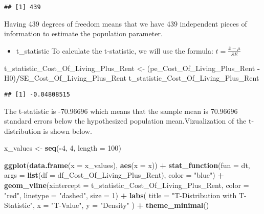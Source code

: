 \documentclass[
]{article}
\newenvironment{Shaded}{\begin{snugshade}}{\end{snugshade}}
\newcommand{\AttributeTok}[1]{\textcolor[rgb]{0.13,0.29,0.53}{#1}}
\newcommand{\DecValTok}[1]{\textcolor[rgb]{0.00,0.00,0.81}{#1}}
\newcommand{\FunctionTok}[1]{\textcolor[rgb]{0.13,0.29,0.53}{\textbf{#1}}}
\newcommand{\NormalTok}[1]{#1}
\newcommand{\OtherTok}[1]{\textcolor[rgb]{0.56,0.35,0.01}{#1}}
\newcommand{\SpecialCharTok}[1]{\textcolor[rgb]{0.81,0.36,0.00}{\textbf{#1}}}
\newcommand{\StringTok}[1]{\textcolor[rgb]{0.31,0.60,0.02}{#1}}
\providecommand{\tightlist}{%
  \setlength{\itemsep}{0pt}\setlength{\parskip}{0pt}}
\begin{document}
\begin{verbatim}
## [1] 439
\end{verbatim}

Having 439 degrees of freedom means that we have 439 independent pieces
of information to estimate the population parameter.

\begin{itemize}
\tightlist
\item
  t\_statistic To calculate the t-statistic, we will use the formula:
  \(t = \frac{\bar{x} - \mu}{SE}\)
\end{itemize}

\begin{Shaded}
\begin{Highlighting}[]
\NormalTok{t\_statistic\_Cost\_Of\_Living\_Plus\_Rent }\OtherTok{\textless{}{-}}\NormalTok{  (pe\_Cost\_Of\_Living\_Plus\_Rent }\SpecialCharTok{{-}}\NormalTok{ H0)}\SpecialCharTok{/}\NormalTok{SE\_Cost\_Of\_Living\_Plus\_Rent}
\NormalTok{t\_statistic\_Cost\_Of\_Living\_Plus\_Rent}
\end{Highlighting}
\end{Shaded}

\begin{verbatim}
## [1] -0.04808515
\end{verbatim}

The t-statistic is -70.96696 which means that the sample mean is
70.96696 standard errors below the hypothesized population
mean.Vizualization of the t-distribution is shown below.

\begin{Shaded}
\begin{Highlighting}[]
\NormalTok{x\_values }\OtherTok{\textless{}{-}} \FunctionTok{seq}\NormalTok{(}\SpecialCharTok{{-}}\DecValTok{4}\NormalTok{, }\DecValTok{4}\NormalTok{, }\AttributeTok{length =} \DecValTok{100}\NormalTok{)}

\FunctionTok{ggplot}\NormalTok{(}\FunctionTok{data.frame}\NormalTok{(}\AttributeTok{x =}\NormalTok{ x\_values), }\FunctionTok{aes}\NormalTok{(}\AttributeTok{x =}\NormalTok{ x)) }\SpecialCharTok{+}
  \FunctionTok{stat\_function}\NormalTok{(}\AttributeTok{fun =}\NormalTok{ dt, }\AttributeTok{args =} \FunctionTok{list}\NormalTok{(}\AttributeTok{df =}\NormalTok{ df\_Cost\_Of\_Living\_Plus\_Rent), }\AttributeTok{color =} \StringTok{"blue"}\NormalTok{) }\SpecialCharTok{+}
  \FunctionTok{geom\_vline}\NormalTok{(}\AttributeTok{xintercept =}\NormalTok{ t\_statistic\_Cost\_Of\_Living\_Plus\_Rent, }\AttributeTok{color =} \StringTok{"red"}\NormalTok{, }\AttributeTok{linetype =} \StringTok{"dashed"}\NormalTok{, }\AttributeTok{size =} \DecValTok{1}\NormalTok{) }\SpecialCharTok{+}
  \FunctionTok{labs}\NormalTok{(}
    \AttributeTok{title =} \StringTok{"T{-}Distribution with T{-}Statistic"}\NormalTok{,}
    \AttributeTok{x =} \StringTok{"T{-}Value"}\NormalTok{,}
    \AttributeTok{y =} \StringTok{"Density"}
\NormalTok{  ) }\SpecialCharTok{+}
  \FunctionTok{theme\_minimal}\NormalTok{()}
\end{Highlighting}
\end{Shaded}
\end{document}
